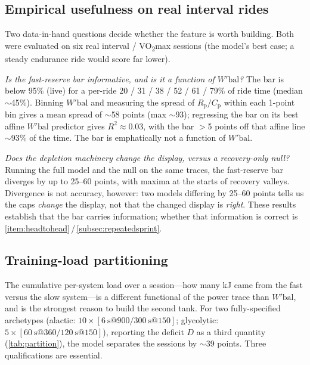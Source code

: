 \documentclass[11pt,a4paper]{article}
\newcommand{\Wbal}{\ensuremath{W'\!\text{bal}}}
\newcommand{\Rp}{\ensuremath{R_{\mathrm p}}}
\newcommand{\Cp}{\ensuremath{C_{\mathrm p}}}
\begin{document}
\subsection{Empirical usefulness on real interval rides}\label{subsec:usefulness}

Two data-in-hand questions decide whether the feature is worth building. Both were evaluated on six real
interval / VO\textsubscript{2}max sessions (the model's best case; a steady endurance ride would score far
lower).

\emph{Is the fast-reserve bar informative, and is it a function of \Wbal?} The bar is below 95\% (live)
for a per-ride 20 / 31 / 38 / 52 / 61 / 79\% of ride time (median $\sim$45\%). Binning \Wbal{} and
measuring the spread of $\Rp/\Cp$ within each 1-point bin gives a mean spread of $\sim$58 points (max
$\sim$93); regressing the bar on its best affine \Wbal{} predictor gives $R^2 \approx 0.03$, with the bar
$>$5 points off that affine line $\sim$93\% of the time. The bar is emphatically not a function of \Wbal.

\emph{Does the depletion machinery change the display, versus a recovery-only null?} Running the full
model and the null on the same traces, the fast-reserve bar diverges by up to 25--60 points, with maxima at
the starts of recovery valleys. Divergence is not accuracy, however: two models differing by 25--60 points
tells us the caps \emph{change} the display, not that the changed display is \emph{right}. These results
establish that the bar carries information; whether that information is correct is
\cref{item:headtohead}\,/\,\cref{subsec:repeatedsprint}.

\subsection{Training-load partitioning}\label{subsec:trainingload}

The cumulative per-system load over a session---how many kJ came from the fast versus the slow
system---is a different functional of the power trace than \Wbal, and is the strongest reason to build the
second tank. For two fully-specified archetypes (alactic:
$10\times[\SI{6}{\second}@900 / \SI{300}{\second}@150]$; glycolytic:
$5\times[\SI{60}{\second}@360 / \SI{120}{\second}@150]$), reporting the deficit $D$ as a third quantity
(\cref{tab:partition}), the model separates the sessions by $\sim$39 points. Three qualifications are
essential.
\end{document}
